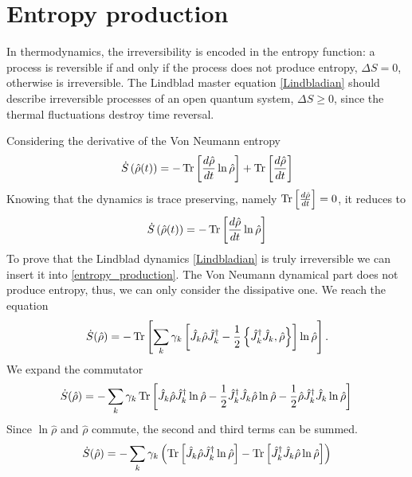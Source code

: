 \section{Entropy production}\label{C_entropy_production}

In thermodynamics, the irreversibility is encoded in the entropy function: a process is reversible if and only if the process does not produce entropy, $\Delta S = 0$, otherwise is irreversible. 
The Lindblad master equation \eqref{Lindbladian} should describe irreversible processes of an open quantum system, $\Delta S \geq 0$, since the thermal fluctuations destroy time reversal. 

Considering the derivative of the Von Neumann entropy
\begin{equation}
    \dot S\left(\hat\rho(t)\right) = -\operatorname{Tr}\left[\frac{d\hat\rho}{dt}\ln\hat\rho\right] + \operatorname{Tr}\left[\frac{d\hat\rho}{dt}\right]
\end{equation}
Knowing that the dynamics is trace preserving, namely $\operatorname{Tr}\left[\frac{d\hat\rho}{dt}\right] = 0$, it reduces to
\begin{equation}\label{entropy_production}
    \dot S\left(\hat\rho(t)\right) = -\operatorname{Tr}\left[\frac{d\hat\rho}{dt}\ln\hat\rho\right] 
\end{equation} 
To prove that the Lindblad dynamics \eqref{Lindbladian} is truly irreversible we can insert it into \eqref{entropy_production}. The Von Neumann dynamical part does not produce entropy, thus, we can only consider the dissipative one. We reach the equation
\begin{equation}
    \dot S(\hat\rho) = -\operatorname{Tr}\left[\sum_{k}\gamma_{k}\left[\hat J_{k} \hat\rho\hat J_{k}^\dagger -\frac{1}{2} \left\{ \hat J_{k}^\dagger \hat J_{k}, \hat\rho\right\}\right]\ln\hat\rho\right].
\end{equation}
We expand the commutator
\begin{equation}
    \dot S(\hat\rho) =-\sum_{k}\gamma_{k}\operatorname{Tr}\left[\hat J_{k} \hat\rho\hat J_{k}^\dagger\ln\hat\rho -\frac{1}{2}\hat J_{k}^\dagger \hat J_{k}\hat\rho \ln\hat\rho-\frac{1}{2} \hat\rho\hat J_{k}^\dagger \hat J_{k}\ln\hat\rho\right]\\
\end{equation}     
Since $\ln\hat\rho$ and $\hat\rho$ commute, the second and third terms can be summed.
\begin{equation}\label{Lindbladian_entropy_production}
    \dot S(\hat\rho) =  -\sum_{k}\gamma_{k}\left(\operatorname{Tr}\left[\hat J_{k} \hat\rho\hat J_{k}^\dagger\ln\hat\rho\right]-\operatorname{Tr}\left[\hat J_{k}^\dagger \hat J_{k}\hat\rho\ln\hat\rho\right]\right)
\end{equation}
